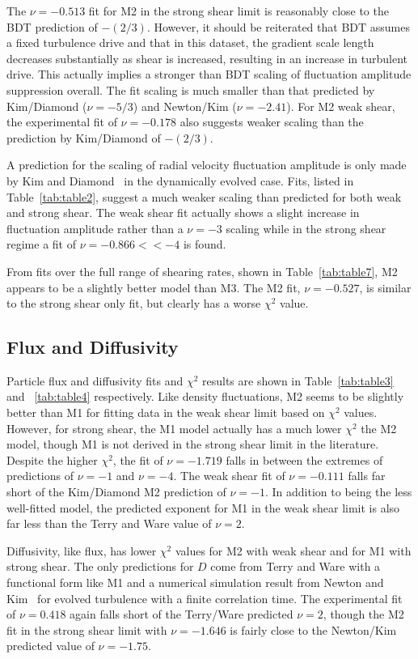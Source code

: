 \documentclass[aip,pop,amsmath,amssymb,peprint,superscriptaddress]{revtex4-1} %
\begin{document}
The $\nu = -0.513$ fit for M2 in the strong shear limit is reasonably close to the BDT prediction of $-(2/3)$. However, it should be reiterated that BDT assumes a fixed turbulence drive and that in this dataset, the gradient scale length decreases substantially as shear is increased, resulting in an increase in turbulent drive.  This actually implies a stronger than BDT scaling of fluctuation amplitude suppression overall. The fit scaling is much smaller than that predicted by Kim/Diamond ($\nu = -5/3$) and Newton/Kim ($\nu = -2.41$). For M2 weak shear, the experimental fit of $\nu = -0.178$ also suggests weaker scaling than the prediction by Kim/Diamond of $-(2/3)$.

A prediction for the scaling of radial velocity fluctuation amplitude is only made by Kim and Diamond~\cite{kim04} in the dynamically evolved case. Fits, listed in Table~\ref{tab:table2}, suggest a much weaker scaling than predicted for both weak and strong shear. The weak shear fit actually shows a slight increase in fluctuation amplitude rather than a $\nu = -3$ scaling while in the strong shear regime a fit of $\nu = -0.866 << -4$ is found.

From fits over the full range of shearing rates, shown in Table~\ref{tab:table7}, M2 appears to be a slightly better model than M3. The M2 fit, $\nu = -0.527$, is similar to the strong shear only fit, but clearly has a worse $\chi^{2}$ value.

\subsection{Flux and Diffusivity}

Particle flux and diffusivity fits and $\chi^{2}$ results are shown in Table~\ref{tab:table3} and ~\ref{tab:table4} respectively. Like density fluctuations, M2 seems to be slightly better than M1 for fitting data in the weak shear limit based on $\chi^{2}$ values.  However, for strong shear, the M1 model actually has a much lower $\chi^{2}$ the M2 model, though M1 is not derived in the strong shear limit in the literature. Despite the higher $\chi^{2}$, the fit of $\nu = -1.719$ falls in between the extremes of predictions of $\nu = -1$ and $\nu = -4$. The weak shear fit of $\nu = -0.111$ falls far short of the Kim/Diamond M2 prediction of $\nu = -1$. In addition to being the less well-fitted model, the predicted exponent for M1 in the weak shear limit is also far less than the Terry and Ware value of $\nu = 2$.

Diffusivity, like flux, has lower $\chi^{2}$ values for M2 with weak shear and for M1 with strong shear. The only predictions for $D$ come from Terry and Ware with a functional form like M1 and a numerical simulation result from Newton and Kim~\cite{newton11} for evolved turbulence with a finite correlation time. The experimental fit of $\nu = 0.418$ again falls short of the Terry/Ware predicted $\nu = 2$, though the M2 fit in the strong shear limit with $\nu = -1.646$ is fairly close to the Newton/Kim predicted value of $\nu = -1.75$.
\end{document}
